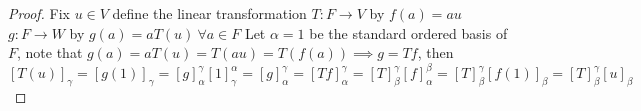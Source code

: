 \begin{proof}
	Fix $u\in V$ define the linear transformation $T : F \longrightarrow V$ by $f(a)  = au$  $g : F\longrightarrow W$ by $g(a) = aT(u)\ \forall a \in F$ Let $\alpha = {1}$ be the standard ordered basis of $F$, note that $g(a) = aT(u) = T(au) = T(f(a)) \implies g = Tf$, then
$$[T(u)]_{\gamma} = [g(1)]_{\gamma} = [g]_{\alpha}^{\gamma}[1]_{\gamma}^{\alpha} = [g]_{\alpha}^{\gamma} = [Tf]_{\alpha}^{\gamma} = [T]_{\beta}^{\gamma}[f]_{\alpha}^{\beta}=[T]_{\beta}^{\gamma}[f(1)]_{\beta} = [T]_{\beta}^{\gamma}[u]_{\beta}$$
\end{proof}

